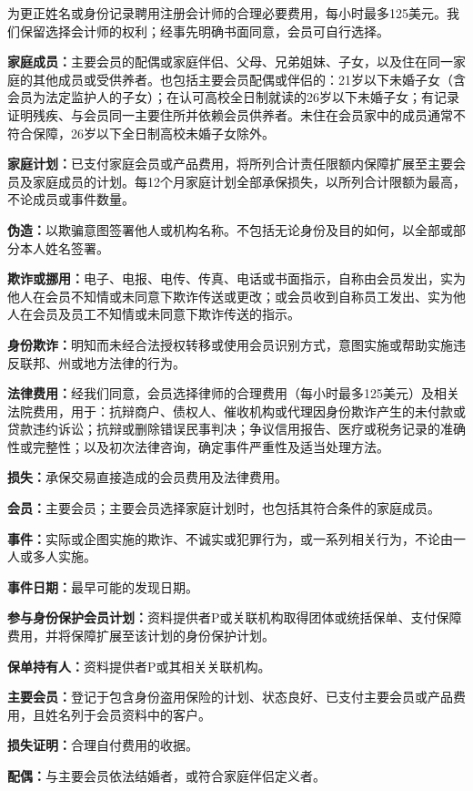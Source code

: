 \documentclass[UTF8,fontset=none,11pt,a4paper]{ctexart}
\begin{document}
为更正姓名或身份记录聘用注册会计师的合理必要费用，每小时最多125美元。我们保留选择会计师的权利；经事先明确书面同意，会员可自行选择。


\textbf{家庭成员：}主要会员的配偶或家庭伴侣、父母、兄弟姐妹、子女，以及住在同一家庭的其他成员或受供养者。也包括主要会员配偶或伴侣的：21岁以下未婚子女（含会员为法定监护人的子女）；在认可高校全日制就读的26岁以下未婚子女；有记录证明残疾、与会员同一主要住所并依赖会员供养者。未住在会员家中的成员通常不符合保障，26岁以下全日制高校未婚子女除外。


\textbf{家庭计划：}已支付家庭会员或产品费用，将所列合计责任限额内保障扩展至主要会员及家庭成员的计划。每12个月家庭计划全部承保损失，以所列合计限额为最高，不论成员或事件数量。


\textbf{伪造：}以欺骗意图签署他人或机构名称。不包括无论身份及目的如何，以全部或部分本人姓名签署。


\textbf{欺诈或挪用：}电子、电报、电传、传真、电话或书面指示，自称由会员发出，实为他人在会员不知情或未同意下欺诈传送或更改；或会员收到自称员工发出、实为他人在会员及员工不知情或未同意下欺诈传送的指示。


\textbf{身份欺诈：}明知而未经合法授权转移或使用会员识别方式，意图实施或帮助实施违反联邦、州或地方法律的行为。


\textbf{法律费用：}经我们同意，会员选择律师的合理费用（每小时最多125美元）及相关法院费用，用于：抗辩商户、债权人、催收机构或代理因身份欺诈产生的未付款或贷款违约诉讼；抗辩或删除错误民事判决；争议信用报告、医疗或税务记录的准确性或完整性；以及初次法律咨询，确定事件严重性及适当处理方法。


\textbf{损失：}承保交易直接造成的会员费用及法律费用。


\textbf{会员：}主要会员；主要会员选择家庭计划时，也包括其符合条件的家庭成员。


\textbf{事件：}实际或企图实施的欺诈、不诚实或犯罪行为，或一系列相关行为，不论由一人或多人实施。


\textbf{事件日期：}最早可能的发现日期。


\textbf{参与身份保护会员计划：}资料提供者P或关联机构取得团体或统括保单、支付保障费用，并将保障扩展至该计划的身份保护计划。


\textbf{保单持有人：}资料提供者P或其相关关联机构。


\textbf{主要会员：}登记于包含身份盗用保险的计划、状态良好、已支付主要会员或产品费用，且姓名列于会员资料中的客户。


\textbf{损失证明：}合理自付费用的收据。


\textbf{配偶：}与主要会员依法结婚者，或符合家庭伴侣定义者。
\end{document}
